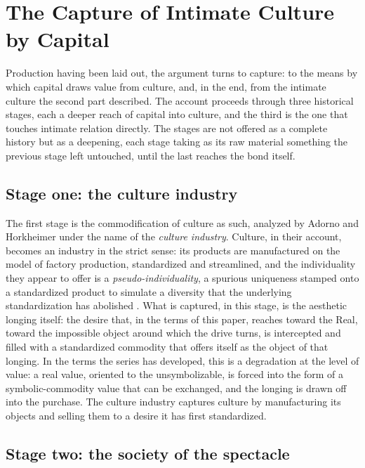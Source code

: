 \section{The Capture of Intimate Culture by Capital}
\label{p24:sec:capture}

\noindent
Production having been laid out, the argument turns to capture: to the means by which capital draws value from culture, and, in the end, from the intimate culture the second part described. The account proceeds through three historical stages, each a deeper reach of capital into culture, and the third is the one that touches intimate relation directly. The stages are not offered as a complete history but as a deepening, each stage taking as its raw material something the previous stage left untouched, until the last reaches the bond itself.

\subsection*{Stage one: the culture industry}

The first stage is the commodification of culture as such, analyzed by Adorno and Horkheimer under the name of the \emph{culture industry}. Culture, in their account, becomes an industry in the strict sense: its products are manufactured on the model of factory production, standardized and streamlined, and the individuality they appear to offer is a \emph{pseudo-individuality}, a spurious uniqueness stamped onto a standardized product to simulate a diversity that the underlying standardization has abolished \parencite{adornohorkheimer2002}. What is captured, in this stage, is the aesthetic longing itself: the desire that, in the terms of this paper, reaches toward the Real, toward the impossible object around which the drive turns, is intercepted and filled with a standardized commodity that offers itself as the object of that longing. In the terms the series has developed, this is a degradation at the level of value: a real value, oriented to the unsymbolizable, is forced into the form of a symbolic-commodity value that can be exchanged, and the longing is drawn off into the purchase. The culture industry captures culture by manufacturing its objects and selling them to a desire it has first standardized.

\subsection*{Stage two: the society of the spectacle}

